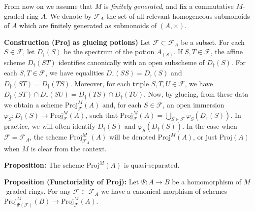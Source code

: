 \documentclass[graybox]{svmult}
\begin{document}
From now on we assume that $M$ is \emph{finitely generated}, and fix a commutative $M$-graded ring $A$.
We denote by $\mathcal{F}_A$ the set of all relevant homogeneous submonoids of $A$ which are finitely generated as submonoids of $(A,\times)$.

\vspace{0.25\baselineskip}
\noindent
\textbf{{Construction (Proj as glueing potions)}}
Let
$\mathcal{F} \subset \mathcal{F}_A$ be a subset.
 For each $S \in \mathcal{F}$, let $D_{\dagger}(S)$ be the spectrum of the potion $A_{(S)}$. 
 If $S,T \in \mathcal{F}$, the affine scheme $D_{\dagger}(ST)$ identifies canonically with an open subscheme of $D_{\dagger}(S)$. For each $S,T \in \mathcal{F}$, we have equalities
$
 D_{\dagger}({S S}) = D_{\dagger}(S) $ and $ D_{\dagger}({ST})=D_{\dagger}({TS}).
$
 Moreover, for each triple $S,T,U \in \mathcal{F}$, we have
$
 D_{\dagger}({ST} )\cap D_{\dagger}({SU}) = D_{\dagger}({TS}) \cap D_{\dagger}({TU}).
$
Now, by glueing, from these data we obtain a scheme $\mathrm{Proj}^M_{\mathcal{F} } (A)$ and, for each $S \in \mathcal{F}$, an open immersion $\varphi_S : D_{\dagger}(S) \to \mathrm{Proj}^M_{\mathcal{F}} (A)$, such that
$
\mathrm{Proj}^M_{\mathcal{F} } (A) = \bigcup_{S \in \mathcal{F} } \varphi_S( D_{\dagger}(S)).
$
In practice, we will often identify $D_{\dagger}(S) $ and $\varphi_S (D_{\dagger}(S))$. 
In the case when $\mathcal{F} = \mathcal{F}_A$,
 the scheme $\mathrm{Proj}^M_{\mathcal{F}_A} (A)$ will be denoted $\mathrm{Proj}^M(A)$, or just $\mathrm{Proj}( A)$ when $M$ is clear from the context.






\vspace{0.25\baselineskip}
\noindent
\textbf{{Proposition:}}
The scheme $\mathrm{Proj}^M(A)$ is quasi-separated.



\vspace{0.25\baselineskip}
\noindent
{\textbf{Proposition (Functoriality of Proj):}} 
Let $\Psi:A \to B $ be a homomorphism of $M$-graded rings. 
For any $\mathcal{F} \subset \mathcal{F}_A$ 
we have a canonical morphism of schemes $\mathrm{Proj}^M_{\Psi (\mathcal{F})} (B) \to \mathrm{Proj}^M_{\mathcal{F} } (A)$. 
\end{document}
